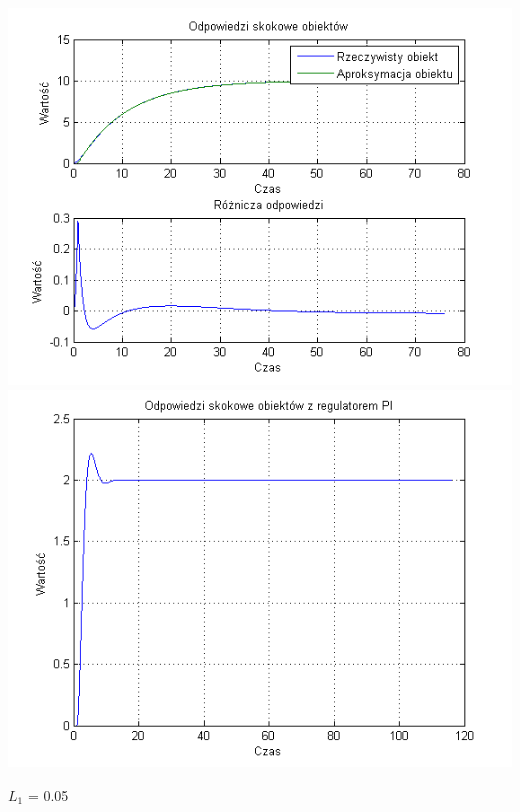 \documentclass[10pt,a4paper]{article}
\begin{document}
\begin{center}
\includegraphics[scale=1]{images/jeden/skrypt_209.png}\\
\includegraphics[scale=1]{images/jeden/skrypt_210.png}\\
\end{center}
\newpage
$L_1$ = 0.05
\end{document}
